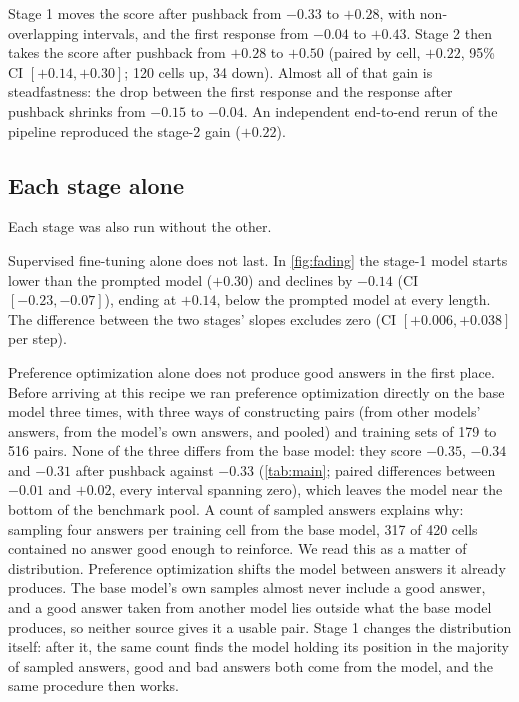 \documentclass[11pt]{article}
\begin{document}
Stage 1 moves the score after pushback from $-0.33$ to $+0.28$, with
non-overlapping intervals, and the first response from $-0.04$ to
$+0.43$. Stage 2 then takes the score after pushback from $+0.28$ to
$+0.50$ (paired by cell, $+0.22$, 95\% CI $[+0.14, +0.30]$; 120 cells
up, 34 down). Almost all of that gain is steadfastness: the drop
between the first response and the response after pushback shrinks
from $-0.15$ to $-0.04$. An independent end-to-end rerun of the
pipeline reproduced the stage-2 gain ($+0.22$).

\subsection{Each stage alone}\label{sec:res-whynot}

Each stage was also run without the other.

Supervised fine-tuning alone does not last. In
\cref{fig:fading} the stage-1 model starts lower than the
prompted model ($+0.30$) and declines by $-0.14$ (CI
$[-0.23, -0.07]$), ending at $+0.14$, below the prompted model at
every length. The difference between the two stages' slopes excludes
zero (CI $[+0.006, +0.038]$ per step).

Preference optimization alone does not produce good answers in the
first place. Before arriving at this recipe we ran preference
optimization directly on the base model three times, with three ways
of constructing pairs (from other models' answers, from the model's
own answers, and pooled) and training sets of 179 to 516 pairs. None
of the three differs from the base model: they score $-0.35$, $-0.34$
and $-0.31$ after pushback against $-0.33$ (\cref{tab:main}; paired
differences between $-0.01$ and $+0.02$, every interval spanning
zero), which leaves the model near the bottom of the benchmark pool. A
count of sampled answers explains why: sampling four answers per
training cell from the base model, 317 of 420 cells contained no
answer good enough to reinforce. We read this as a matter of distribution. Preference
optimization shifts the model between answers it already produces. The
base model's own samples almost never include a good answer, and a
good answer taken from another model lies outside what the base model
produces, so neither source gives it a usable pair. Stage 1 changes
the distribution itself: after it, the same count finds the model
holding its position in the majority of sampled answers, good and bad
answers both come from the model, and the same procedure then works.
\end{document}

